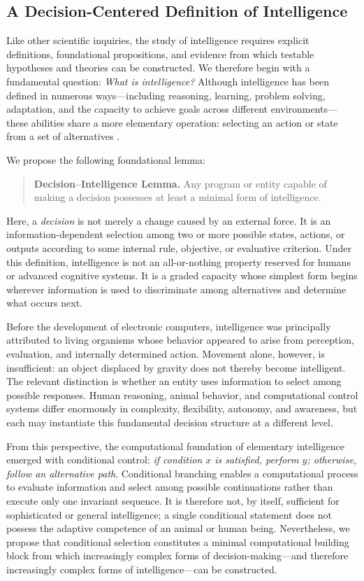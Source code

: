\subsection{A Decision-Centered Definition of Intelligence}
\label{subsec:decision-intelligence}

Like other scientific inquiries, the study of intelligence requires explicit
definitions, foundational propositions, and evidence from which testable
hypotheses and theories can be constructed. We therefore begin with a fundamental
question: \emph{What is intelligence?} Although intelligence has been defined in
numerous ways---including reasoning, learning, problem solving, adaptation, and
the capacity to achieve goals across different environments---these abilities
share a more elementary operation: selecting an action or state from a set of
alternatives \cite{legg2007universal,newell1976computer}.

We propose the following foundational lemma:

\begin{quote}
\textbf{Decision--Intelligence Lemma.} Any program or entity capable of making a
decision possesses at least a minimal form of intelligence.
\end{quote}

Here, a \emph{decision} is not merely a change caused by an external force. It is
an information-dependent selection among two or more possible states, actions, or
outputs according to some internal rule, objective, or evaluative criterion.
Under this definition, intelligence is not an all-or-nothing property reserved
for humans or advanced cognitive systems. It is a graded capacity whose simplest
form begins wherever information is used to discriminate among alternatives and
determine what occurs next.

Before the development of electronic computers, intelligence was principally
attributed to living organisms whose behavior appeared to arise from perception,
evaluation, and internally determined action. Movement alone, however, is
insufficient: an object displaced by gravity does not thereby become intelligent.
The relevant distinction is whether an entity uses information to select among
possible responses. Human reasoning, animal behavior, and computational control
systems differ enormously in complexity, flexibility, autonomy, and awareness,
but each may instantiate this fundamental decision structure at a different
level.

From this perspective, the computational foundation of elementary intelligence
emerged with conditional control: \emph{if condition $x$ is satisfied, perform
$y$; otherwise, follow an alternative path}. Conditional branching enables a
computational process to evaluate information and select among possible
continuations rather than execute only one invariant sequence. It is therefore
not, by itself, sufficient for sophisticated or general intelligence; a single
conditional statement does not possess the adaptive competence of an animal or
human being. Nevertheless, we propose that conditional selection constitutes a
minimal computational building block from which increasingly complex forms of
decision-making---and therefore increasingly complex forms of
intelligence---can be constructed.

